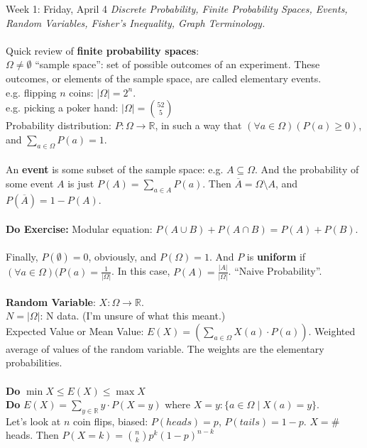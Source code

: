 \documentclass[12pt]{article}
\theoremstyle{remark}
\newcommand{\R}{\mathbb{R}}
\begin{document}
\label{3}\begin{section}{Week 1: Friday, April 4}
\indent\textit{Discrete Probability, Finite Probability Spaces, Events, Random Variables, Fisher's Inequality, Graph Terminology.}
\\\\
Quick review of \textbf{finite probability spaces}:
\\ $\Omega \neq \emptyset$ ``sample space'': set of possible outcomes of an experiment. These outcomes, or elements of the sample space, are called elementary events.
\\\indent e.g. flipping $n$ coins: $|\Omega| = 2^n$.
\\\indent e.g. picking a poker hand: $|\Omega| = {52 \choose 5}$
\\ Probability distribution: $P : \Omega \to \R$, in such a way that $(\forall a \in \Omega)(P(a) \geq 0)$, and $\sum_{a \in \Omega} P(a) = 1$.
\\\\An \textbf{event} is some subset of the sample space: e.g. $A \subseteq \Omega$. And the probability of some event $A$ is just $P(A) = \sum_{a \in A} P(a)$. Then $\overline{A} = \Omega \setminus A$, and $P(\overline{A}) = 1- P(A)$.
\\\\\textbf{Do Exercise:} Modular equation: $P(A \cup B) + P(A \cap B) = P(A) + P(B)$.
\\\\Finally, $P(\emptyset) = 0$, obviously, and $P(\Omega)=1$. And $P$ is \textbf{uniform} if $(\forall a \in \Omega)(P(a) = \frac{1}{|\Omega|}$. In this case, $P(A) = \frac{|A|}{|\Omega|}$. ``Naive Probability''.
\\\\\textbf{Random Variable}: $X: \Omega \to \R$.
\\$N = |\Omega|$: N data. (I'm unsure of what this meant.)
\\Expected Value or Mean Value: $E(X) = \left(\sum_{a \in \Omega} X(a) \cdot P(a)\right)$. Weighted average of values of the random variable. The weights are the elementary probabilities.
\\\\\textbf{Do} $\min X \leq E(X) \leq \max X$
\\\textbf{Do} $E(X) = \sum_{y \in \R} y \cdot P(X=y)$ where $X=y : \{ a \in \Omega \mid X(a) = y\}$.
\\Let's look at $n$ coin flips, biased: $P(heads) = p$, $P(tails) = 1 - p$. $X = \#$ heads. Then $P(X=k) = {n \choose k}p^k(1-p)^{n-k}$

\end{section}
\end{document}
